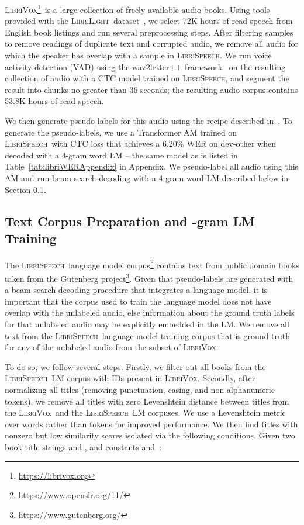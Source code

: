 \documentclass{article}
\newcommand{\librivox}{\textsc{LibriVox}}
\newcommand{\librilight}{\textsc{LibriLight}}
\newcommand{\librispeech}{\textsc{LibriSpeech}}
\begin{document}
\librivox\footnote{\url{https://librivox.org}}~is a large collection of freely-available audio books. Using tools provided with the \librilight~dataset~\cite{librilight}, we select 72K hours of read speech from English book listings and run several preprocessing steps. After filtering samples to remove readings of duplicate text and corrupted audio, we remove all audio for which the speaker has overlap with a sample in \librispeech. We run voice activity detection (VAD) using the wav2letter++ framework~\cite{pratap2018wav2letter} on the resulting collection of audio with a CTC model trained on \librispeech, and segment the result into chunks no greater than 36 seconds; the resulting audio corpus contains 53.8K hours of read speech.

We then generate pseudo-labels for this audio using the recipe described in~\cite{kahn2019self}. To generate the pseudo-labels, we use a Transformer AM trained on \librispeech~with CTC loss that achieves a 6.20\% WER on dev-other when decoded with a 4-gram word LM -- the same model as is listed in Table~\ref{tab:libriWERAppendix} in Appendix. We pseudo-label all audio using this AM and run beam-search decoding with a 4-gram word LM described below in Section \ref{sec:librivoxlmcorpus}.

\subsection{Text Corpus Preparation and -gram LM Training}
\label{sec:librivoxlmcorpus}

The \librispeech~language model corpus\footnote{\url{https://www.openslr.org/11/}} contains text from  public domain books taken from the Gutenberg project\footnote{\url{https://www.gutenberg.org/}}. Given that pseudo-labels are generated with a beam-search decoding procedure that integrates a language model, it is important that the corpus used to train the language model does not have overlap with the unlabeled audio, else information about the ground truth labels for that unlabeled audio may be explicitly embedded in the LM. We remove all text from the \librispeech~language model training corpus that is ground truth for any of the unlabeled audio from the subset of \librivox.

To do so, we follow several steps. Firstly, we filter out all books from the \librispeech~LM corpus with IDs present in \librivox. Secondly, after normalizing all titles (removing punctuation, casing, and non-alphanumeric tokens), we remove all titles with zero Levenshtein distance between titles from the \librivox~and the \librispeech~LM corpuses. We use a Levenshtein metric over words rather than tokens for improved performance. We then find titles with nonzero but low similarity scores isolated via the following conditions. Given two book title strings  and , and constants  and~:
\end{document}
